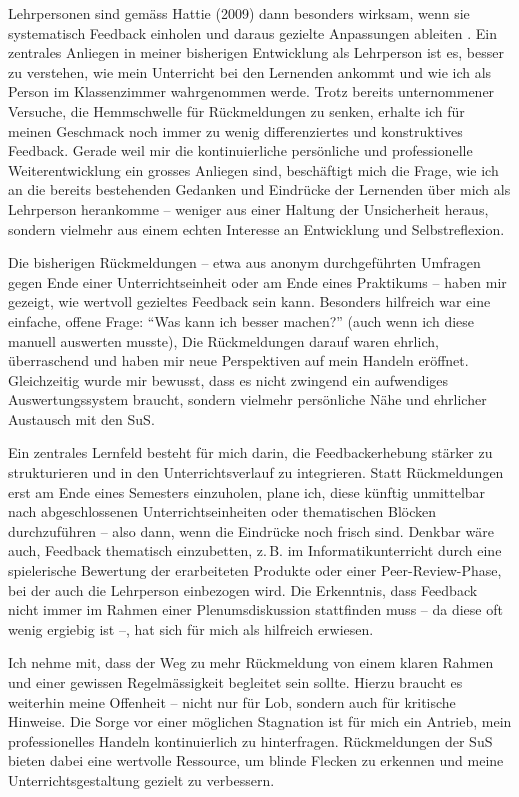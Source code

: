Lehrpersonen sind gemäss Hattie (2009) dann besonders wirksam, wenn sie systematisch Feedback einholen und daraus gezielte Anpassungen ableiten \cite{alma991171885796805501}. Ein zentrales Anliegen in meiner bisherigen Entwicklung als Lehrperson ist es, besser zu verstehen, wie mein Unterricht bei den Lernenden ankommt und wie ich als Person im Klassenzimmer wahrgenommen werde. Trotz bereits unternommener Versuche, die Hemmschwelle für Rückmeldungen zu senken, erhalte ich für meinen Geschmack noch immer zu wenig differenziertes und konstruktives Feedback. Gerade weil mir die kontinuierliche persönliche und professionelle Weiterentwicklung ein grosses Anliegen sind, beschäftigt mich die Frage, wie ich an die bereits bestehenden Gedanken und Eindrücke der Lernenden über mich als Lehrperson herankomme -- weniger aus einer Haltung der Unsicherheit heraus, sondern vielmehr aus einem echten Interesse an Entwicklung und Selbstreflexion.

Die bisherigen Rückmeldungen -- etwa aus anonym durchgeführten Umfragen gegen Ende einer Unterrichtseinheit oder am Ende eines Praktikums -- haben mir gezeigt, wie wertvoll gezieltes Feedback sein kann. Besonders hilfreich war eine einfache, offene Frage: \enquote{Was kann ich besser machen?} (auch wenn ich diese manuell auswerten musste), Die Rückmeldungen darauf waren ehrlich, überraschend und haben mir neue Perspektiven auf mein Handeln eröffnet. Gleichzeitig wurde mir bewusst, dass es nicht zwingend ein aufwendiges Auswertungssystem braucht, sondern vielmehr persönliche Nähe und ehrlicher Austausch mit den SuS.

Ein zentrales Lernfeld besteht für mich darin, die Feedbackerhebung stärker zu strukturieren und in den Unterrichtsverlauf zu integrieren. Statt Rückmeldungen erst am Ende eines Semesters einzuholen, plane ich, diese künftig unmittelbar nach abgeschlossenen Unterrichtseinheiten oder thematischen Blöcken durchzuführen -- also dann, wenn die Eindrücke noch frisch sind. Denkbar wäre auch, Feedback thematisch einzubetten, z.\,B. im Informatikunterricht durch eine spielerische Bewertung der erarbeiteten Produkte oder einer Peer-Review-Phase, bei der auch die Lehrperson einbezogen wird. Die Erkenntnis, dass Feedback nicht immer im Rahmen einer Plenumsdiskussion stattfinden muss -- da diese oft wenig ergiebig ist --, hat sich für mich als hilfreich erwiesen.

Ich nehme mit, dass der Weg zu mehr Rückmeldung von einem klaren Rahmen und einer gewissen Regelmässigkeit begleitet sein sollte. Hierzu braucht es weiterhin meine Offenheit -- nicht nur für Lob, sondern auch für kritische Hinweise. Die Sorge vor einer möglichen Stagnation ist für mich ein Antrieb, mein professionelles Handeln kontinuierlich zu hinterfragen. Rückmeldungen der SuS bieten dabei eine wertvolle Ressource, um blinde Flecken zu erkennen und meine Unterrichtsgestaltung gezielt zu verbessern.

